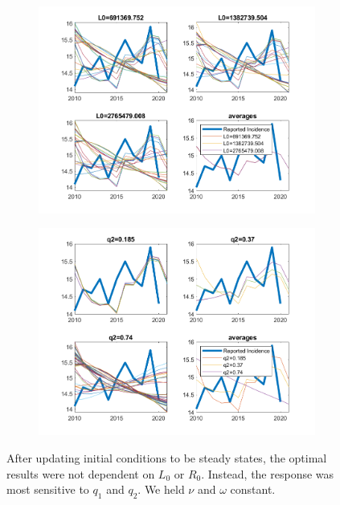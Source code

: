 \documentclass{article}
\begin{document}
\begin{figure}
	\begin{subfigure}[b]{0.475\textwidth}
		\centering
		\includegraphics[width=\textwidth]{Sensitivty_L0 run4.png}
	\end{subfigure} 
	\hfill   
	\begin{subfigure}[b]{0.475\textwidth}
		\centering
		\includegraphics[width=\textwidth]{Sensitivty_q2 run4.png}  
	\end{subfigure} 
	
	\caption{After updating initial conditions to be steady states, the optimal results were not dependent on $L_0$ or $R_0$.  Instead, the response was most sensitive to $q_1$ and $q_2$.  We held $\nu$ and $\omega$ constant.}
	\label{fig:HistoOptimalSS}
\end{figure}
\end{document}
